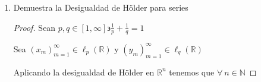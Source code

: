 \documentclass[12pt]{article}
\newcommand\N{\ensuremath{\mathbb{N}}}
\newcommand\R{\ensuremath{\mathbb{R}}}
\begin{document}
\begin{enumerate}[label=\textbf{\arabic*}.]
\begin{proof}
    \begin{enumerate}
        \item $\forall \: x,y \in A \cup B$ se tienen los siguientes casos
        \begin{enumerate}
            \item Si $x , y \in A \Rightarrow d(x,y) \leqslant  \text{diam} (A) \leqslant  \text{diam} (A) +  \text{diam} (B)$
            \item Si $x , y \in B \Rightarrow d(x,y) \leqslant  \text{diam} (B) \leqslant  \text{diam} (B) +  \text{diam} (A)$
            \item SPG supongamos que $x \in A$ y que $y \in B \Rightarrow \: \exists \: z \in A \cap B $
            \begin{equation*}
                \Rightarrow d(x,y) \leqslant d(x,z) + d(z,y) \leqslant \text{diam} (A) +  \text{diam} (B)
            \end{equation*}
        \end{enumerate}
        \item Creo que no 
        \item Creo que no
        \item Creo que no
        \item Esto es cierto ya que en la definición de distancia se puede ver que proviene de una norma, y esto sucede si y solo si saca escalares en valor absoluto.
        
    \end{enumerate}
\end{proof}

\item Demuestra la Desigualdad de Hölder para series

\begin{proof}
    Sean $p, q \in [1, \infty] \backepsilon \frac{1}{p}+\frac{1}{q}= 1$

    Sea ${({x}_{m})}_{m=1}^{\infty} \in {\ell}_{p} (\R)$ y ${({y}_{m})}_{m=1}^{\infty} \in {\ell}_{q} (\R)$

    Aplicando la desigualdad de Hölder en $\R^n$ tenemos que $\forall \: n \in \N $


\end{proof}
\end{enumerate}
\end{document}
